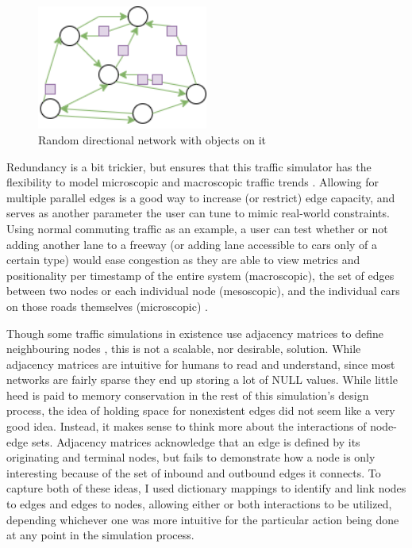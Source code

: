 \begin{figure}[H]
    \centering
	\includegraphics[width=0.5\textwidth]{tex files/Figures/generic_network.png}
	\caption[Random directional network]{Random directional network with objects on it}
	\label{fig:generic_network}
\end{figure}

\par Redundancy is a bit trickier, but ensures that this traffic simulator has the flexibility to model microscopic and macroscopic traffic trends \cite{LWB18}.  Allowing for multiple parallel edges is a good way to increase (or restrict) edge capacity, and serves as another parameter the user can tune to mimic real-world constraints.  Using normal commuting traffic as an example, a user can test whether or not adding another lane to a freeway (or adding lane accessible to cars only of a certain type) would ease congestion as they are able to view metrics and positionality per timestamp of the entire system (macroscopic), the set of edges between two nodes or each individual node (mesoscopic), and the individual cars on those roads themselves (microscopic) \cite{LWB18}. \\


\par Though some traffic simulations in existence use adjacency matrices to define neighbouring nodes \cite{GPK02}, this is not a scalable, nor desirable, solution.  While adjacency matrices are intuitive for humans to read and understand, since most networks are fairly sparse they end up storing a lot of NULL values.  While little heed is paid to memory conservation in the rest of this simulation's design process, the idea of holding space for nonexistent edges did not seem like a very good idea.  Instead, it makes sense to think more about the interactions of node-edge sets.  Adjacency matrices acknowledge that an edge is defined by its originating and terminal nodes, but fails to demonstrate how a node is only interesting because of the set of inbound and outbound edges it connects.  To capture both of these ideas, I used dictionary mappings to identify and link nodes to edges and edges to nodes, allowing either or both interactions to be utilized, depending whichever one was more intuitive for the particular action being done at any point in the simulation process.\\



